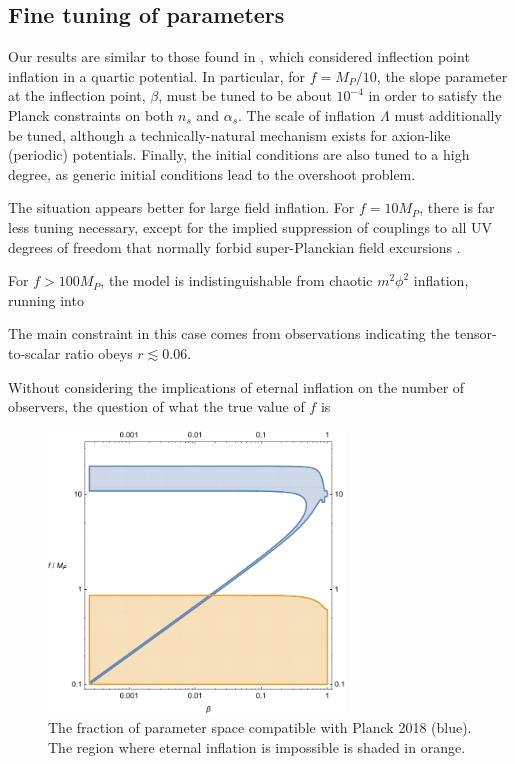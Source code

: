 \documentclass[aps,amsfonts,amsmath,prd,preprint,nofootinbib,superscriptaddress]{revtex4}
\newcommand{\Mp}{{M_{P}}}
\begin{document}

\subsection{Fine tuning of parameters}
Our results are similar to those found in \cite{Musoke:2017frr}, which considered inflection point inflation in a quartic potential.  In particular, for $f = \Mp/10$, the slope parameter at the inflection point, $\beta$, must be
tuned to be about $10^{-4}$ in order to satisfy the Planck constraints on both $n_s$ and $\alpha_s$.  The scale of inflation $\Lambda$ must additionally be tuned, although a technically-natural mechanism exists for axion-like (periodic) potentials.  Finally, the initial conditions are also tuned to a high degree, as generic initial conditions lead to the overshoot problem.

The situation appears better for large field inflation.
For $f = 10 \Mp$, there is far less tuning necessary, except for the implied suppression of couplings to all UV degrees of freedom that normally forbid super-Planckian field excursions \cite{swampland, monodromy}.

For $f > 100 \Mp$, the model is indistinguishable from chaotic $m^2\phi^2$ inflation, running into  

The main constraint in this case comes from observations indicating the tensor-to-scalar ratio obeys $r \lesssim 0.06$.

Without considering the implications of eternal inflation on the number of observers, the question of what the true value of $f$ is 


\begin{figure}[!h]
  \centering
    \includegraphics[width=0.7\textwidth]{figures/fbregionPlanck2018.pdf}
    \caption{The fraction of parameter space compatible with Planck 2018 (blue).  The region where eternal inflation is impossible is shaded in orange.}
\end{figure}
\end{document}
